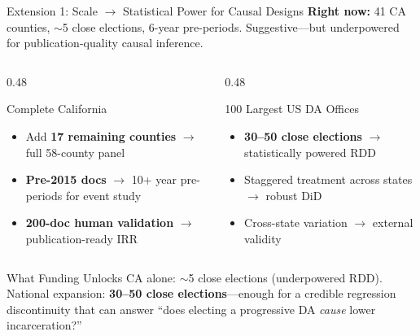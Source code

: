 \documentclass[aspectratio=169, 11pt]{beamer}
\begin{document}
\begin{frame}{Extension 1: Scale $\to$ Statistical Power for Causal Designs}
{\small \textbf{Right now:} 41 CA counties, $\sim$5 close elections, 6-year pre-periods. Suggestive---but underpowered for publication-quality causal inference.}
\vspace{4pt}
\begin{columns}[T]
\begin{column}{0.48\textwidth}
\begin{block}{Complete California}
\begin{itemize}\setlength\itemsep{2pt}
    \item Add \textbf{17 remaining counties} $\to$ full 58-county panel
    \item \textbf{Pre-2015 docs} $\to$ 10+ year pre-periods for event study
    \item \textbf{200-doc human validation} $\to$ publication-ready IRR
\end{itemize}
\end{block}
\end{column}
\begin{column}{0.48\textwidth}
\begin{block}{100 Largest US DA Offices}
\begin{itemize}\setlength\itemsep{2pt}
    \item \textbf{30--50 close elections} $\to$ statistically powered RDD
    \item Staggered treatment across states $\to$ robust DiD
    \item Cross-state variation $\to$ external validity
\end{itemize}
\end{block}
\end{column}
\end{columns}
\vspace{6pt}
\begin{alertblock}{What Funding Unlocks}
CA alone: $\sim$5 close elections (underpowered RDD). National expansion: \textbf{30--50 close elections}---enough for a credible regression discontinuity that can answer ``does electing a progressive DA \emph{cause} lower incarceration?''
\end{alertblock}
\end{frame}
\end{document}
